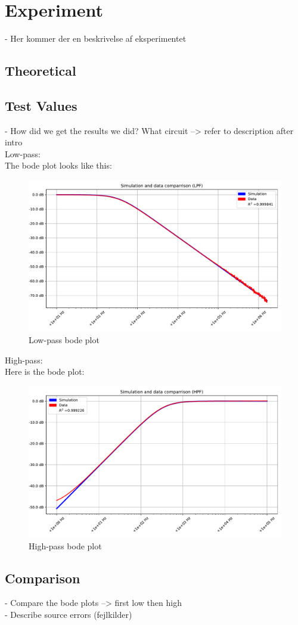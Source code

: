 \section{Experiment} \label{experiment}
- Her kommer der en beskrivelse af eksperimentet
\subsection{Theoretical}

\subsection{Test Values}
- How did we get the results we did? What circuit --> refer to description after intro \\
Low-pass: \\
The bode plot looks like this:
\begin{figure}[H]
\center
	\includegraphics[scale=0.5]{fig/img/bode_LPF_plot.pdf}
	\caption{Low-pass bode plot}
	\label{lp:bode}
\end{figure}
High-pass: \\
Here is the bode plot:
\begin{figure}[H]
\center
	\includegraphics[scale=0.5]{fig/img/bode_HPF_plot.pdf}
	\caption{High-pass bode plot}
	\label{hp:bode}
\end{figure}
\subsection{Comparison}
- Compare the bode plots --> first low then high \\
- Describe source errors (fejlkilder)
